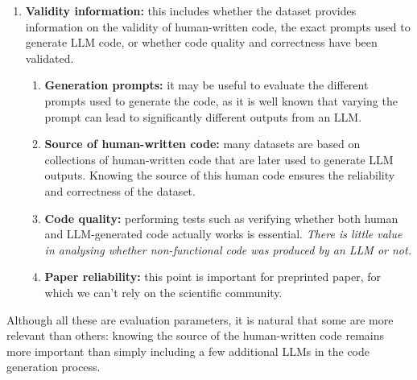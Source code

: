 \begin{enumerate}
    \item \textbf{Validity information:} 
    this includes whether the dataset provides information on the 
    validity of human-written code, the exact prompts used to generate 
    LLM code, or whether code quality and correctness have been validated.
    \begin{enumerate}
        \item \textbf{Generation prompts:}
        it may be useful to evaluate the different 
        prompts used to generate the code, as it is 
        well known that varying the prompt can lead to 
        significantly different outputs from an LLM.
        \item \textbf{Source of human-written code:}
        many datasets are based on collections of human-written 
        code that are later used to generate LLM outputs. Knowing 
        the source of this human code ensures the reliability 
        and correctness of the dataset.
        \item \textbf{Code quality:}
        performing tests such as verifying whether 
        both human and LLM-generated code actually 
        works is essential. \textit{There is little value in 
        analysing whether non-functional code was 
        produced by an LLM or not.}
        \item \textbf{Paper reliability:} 
        this point is important for preprinted paper, for which 
        we can't rely on the scientific community.
    \end{enumerate}

\end{enumerate}


Although all these are evaluation parameters, it is natural that some 
are more relevant than others: knowing the source of the human-written 
code remains more important than simply including a few additional LLMs 
in the code generation process.
